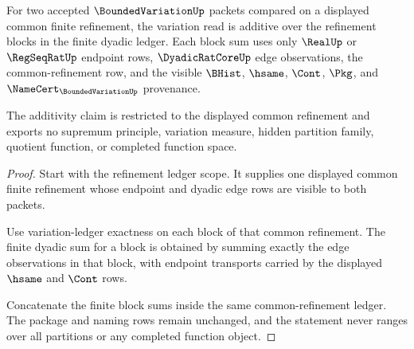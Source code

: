 \begin{theorem}
\label{thm:bounded-variation-refinement-additivity-scope}
For two accepted $\BoundedVariationUp$ packets compared on a displayed common finite refinement, the variation read is additive over the refinement blocks in the finite dyadic ledger. Each block sum uses only $\RealUp$ or $\RegSeqRatUp$ endpoint rows, $\DyadicRatCoreUp$ edge observations, the common-refinement row, and the visible $\BHist$, $\hsame$, $\Cont$, $\Pkg$, and $\NameCert_{\BoundedVariationUp}$ provenance.

The additivity claim is restricted to the displayed common refinement and exports no supremum principle, variation measure, hidden partition family, quotient function, or completed function space.
\end{theorem}
\begin{proof}
Start with the refinement ledger scope. It supplies one displayed common finite refinement whose endpoint and dyadic edge rows are visible to both packets.

Use variation-ledger exactness on each block of that common refinement. The finite dyadic sum for a block is obtained by summing exactly the edge observations in that block, with endpoint transports carried by the displayed $\hsame$ and $\Cont$ rows.

Concatenate the finite block sums inside the same common-refinement ledger. The package and naming rows remain unchanged, and the statement never ranges over all partitions or any completed function object.
\end{proof}

